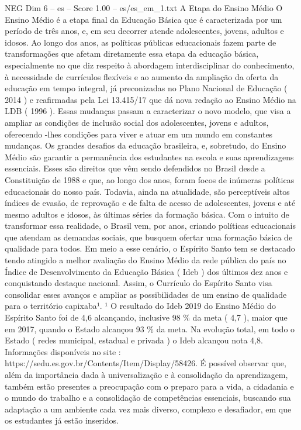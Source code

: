 \begin{textsample}{NEG Dim 6 – es – Score 1.00 – es/es\_em\_1.txt}  \label{ex:f6_neg_145}
A Etapa do Ensino Médio O Ensino Médio é a etapa final da Educação Básica que é caracterizada por um período de três anos, e, em seu decorrer atende adolescentes, jovens, adultos e idosos.
Ao longo dos anos, as políticas públicas educacionais fazem parte de transformações que afetam diretamente essa etapa da educação básica, especialmente no que diz respeito à abordagem interdisciplinar do conhecimento, à necessidade de currículos flexíveis e ao aumento da ampliação da oferta da educação em tempo integral, já preconizadas no Plano Nacional de Educação ( 2014 ) e reafirmadas pela Lei 13.415/17 que dá nova redação ao Ensino Médio na LDB ( 1996 ).
Essas mudanças passam a caracterizar o novo modelo, que visa a ampliar as condições de inclusão social dos adolescentes, jovens e adultos, oferecendo -lhes condições para viver e atuar em um mundo em constantes mudanças.
Os grandes desafios da educação brasileira, e, sobretudo, do Ensino Médio são garantir a permanência dos estudantes na escola e suas aprendizagens essenciais.
Esses são direitos que vêm sendo defendidos no Brasil desde a Constituição de 1988 e que, ao longo dos anos, foram focos de inúmeras políticas educacionais do nosso país.
Todavia, ainda na atualidade, são perceptíveis altos índices de evasão, de reprovação e de falta de acesso de adolescentes, jovens e até mesmo adultos e idosos, às últimas séries da formação básica.
Com o intuito de transformar essa realidade, o Brasil vem, por anos, criando políticas educacionais que atendam as demandas sociais, que busquem ofertar uma formação básica de qualidade para todos.
Em meio a esse cenário, o Espírito Santo tem se destacado tendo atingido a melhor avaliação do Ensino Médio da rede pública do país no Índice de Desenvolvimento da Educação Básica ( Ideb ) dos últimos dez anos e conquistando destaque nacional.
Assim, o Currículo do Espírito Santo visa consolidar esses avanços e ampliar as possibilidades de um ensino de qualidade para o território capixaba¹. ¹ O resultado do Ideb 2019 do Ensino Médio do Espírito Santo foi de 4,6 alcançando, inclusive 98 \% da meta ( 4,7 ), maior que em 2017, quando o Estado alcançou 93 \% da meta.
Na evolução total, em todo o Estado ( redes municipal, estadual e privada ) o Ideb alcançou nota 4,8.
Informações disponíveis no site : https://sedu.es.gov.br/Contents/Item/Display/58426.
É possível observar que, além da importância dada à universalização e à consolidação da aprendizagem, também estão presentes a preocupação com o preparo para a vida, a cidadania e o mundo do trabalho e a consolidação de competências essenciais, buscando sua adaptação a um ambiente cada vez mais diverso, complexo e desafiador, em que os estudantes já estão inseridos.

\end{textsample}
